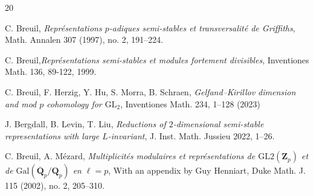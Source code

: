 \documentclass[11pt]{amsart}
\theoremstyle{definition}
\numberwithin{equation}{subsection}
\theoremstyle{plain}
\theoremstyle{plain}
\theoremstyle{plain}
\theoremstyle{plain}
\theoremstyle{plain}
\theoremstyle{plain}
\theoremstyle{plain}
\theoremstyle{plain}
\theoremstyle{plain}
\theoremstyle{plain}
\theoremstyle{plain}
\theoremstyle{plain}
\theoremstyle{definition}
\theoremstyle{definition}
\theoremstyle{definition}
\theoremstyle{remark}
\renewcommand{\(}{\textup{(}}
\renewcommand{\)}{\textup{)}}
\newcommand{\Q}{\mathbf{Q}}
\newcommand{\Z}{\mathbf{Z}}
\newcommand{\GL}{\mathrm{GL}}
\begin{document}

\begin{thebibliography}{20}



 C. Breuil, \emph{Repr\'esentations $p$-adiques semi-stables et transversalit\'e de Griffiths}, Math. Annalen 307 (1997), no. 2, 191--224.

 C. Breuil,\emph{Repr\'esentations semi-stables et modules fortement divisibles}, Inventiones Math. 136, 89-122, 1999.







 C. Breuil, F. Herzig, Y. Hu, S. Morra, B. Schraen, \emph{Gelfand--Kirillov dimension and mod $p$ cohomology for $\GL_2$}, Inventiones Math. 234, 1--128 (2023)

 J. Bergdall, B. Levin, T. Liu, \emph{Reductions of $2$-dimensional semi-stable representations with large $L$-invariant}, J. Inst. Math. Jussieu 2022, 1--26.


 C. Breuil, A. M\'ezard, \emph{Multiplicit\'es modulaires et repr\'esentations de $\GL{2}(\Z_p)$ et de $\mathrm{Gal}(\overline{\Q}_p/\Q_p)$ en $\ell = p$}, With an appendix by Guy Henniart, Duke Math. J. 115 (2002), no. 2, 205--310.



\end{thebibliography}
\end{document}

